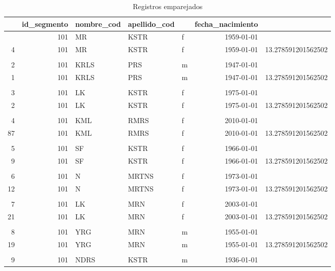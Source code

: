 \documentclass[
  12pt,
]{book}
\begin{document}
\begin{table}[t]
\caption*{
{\fontsize{20}{25}\selectfont  Registros emparejados\fontsize{12}{15}\selectfont }
} 
\fontsize{12.0pt}{14.0pt}\selectfont
\begin{tabular*}{1\linewidth}{@{\extracolsep{\fill}}rrlllrr}
\toprule
{\bfseries \cellcolor[HTML]{F9F9F9}{id}} & id\_segmento & nombre\_cod & apellido\_cod & {\bfseries \cellcolor[HTML]{F9F9F9}{sexo}} & fecha\_nacimiento & {\bfseries \cellcolor[HTML]{F9F9F9}{Weight}} \\ 
\midrule\addlinespace[2.5pt]
 1 & 101 & MR & KSTR & f & 1959-01-01 &  \\ 
 4 & 101 & MR & KSTR & f & 1959-01-01 & 13.278591201562502 \\ 
 &  &  &  &  &  &  \\ 
 2 & 101 & KRLS & PRS & m & 1947-01-01 &  \\ 
 1 & 101 & KRLS & PRS & m & 1947-01-01 & 13.278591201562502 \\ 
 &  &  &  &  &  &  \\ 
 3 & 101 & LK & KSTR & f & 1975-01-01 &  \\ 
 2 & 101 & LK & KSTR & f & 1975-01-01 & 13.278591201562502 \\ 
 &  &  &  &  &  &  \\ 
 4 & 101 & KML & RMRS & f & 2010-01-01 &  \\ 
87 & 101 & KML & RMRS & f & 2010-01-01 & 13.278591201562502 \\ 
 &  &  &  &  &  &  \\ 
 5 & 101 & SF & KSTR & f & 1966-01-01 &  \\ 
 9 & 101 & SF & KSTR & f & 1966-01-01 & 13.278591201562502 \\ 
 &  &  &  &  &  &  \\ 
 6 & 101 & N & MRTNS & f & 1973-01-01 &  \\ 
12 & 101 & N & MRTNS & f & 1973-01-01 & 13.278591201562502 \\ 
 &  &  &  &  &  &  \\ 
 7 & 101 & LK & MRN & f & 2003-01-01 &  \\ 
21 & 101 & LK & MRN & f & 2003-01-01 & 13.278591201562502 \\ 
 &  &  &  &  &  &  \\ 
 8 & 101 & YRG & MRN & m & 1955-01-01 &  \\ 
19 & 101 & YRG & MRN & m & 1955-01-01 & 13.278591201562502 \\ 
 &  &  &  &  &  &  \\ 
 9 & 101 & NDRS & KSTR & m & 1936-01-01 &  \\ 

\end{tabular*}
\end{table}
\end{document}
